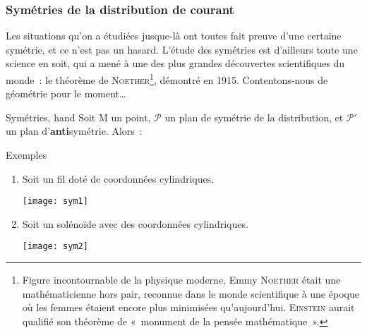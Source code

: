 \documentclass[../main/main.tex]{subfiles}
\begin{document}
\subsubsection{Symétries de la distribution de courant}
\label{sssec:symdist}
Les situations qu'on a étudiées jusque-là ont toutes fait preuve d'une certaine
symétrie, et ce n'est pas un hasard. L'étude des symétries est d'ailleurs toute
une science en soit, qui a mené à une des plus grandes découvertes scientifiques
du monde~: le théorème de \textsc{Noether}\footnote{Figure incontournable de la
  physique moderne, Emmy \textsc{Noether} était une mathématicienne hors pair,
reconnue dans le monde scientifique à une époque où les femmes étaient encore
plus minimisées qu'aujourd'hui. \textsc{Einstein} aurait qualifié son théorème
de «~monument de la pensée mathématique~».}, démontré en 1915. Contentons-nous
de géométrie pour le moment…
\begin{tror}{Symétries, hand}
  Soit M un point, $\mathcal{P}$ un plan de symétrie de la distribution, et
  $\mathcal{P'}$ un plan d'\textbf{anti}symétrie. Alors~:
\end{tror}
\begin{texem}{Exemples}
  \begin{enumerate}
    \item Soit un fil doté de coordonnées cylindriques.
      \begin{center}
        \texttt{[image: sym1]}
      \end{center}
      \item Soit un solénoïde avec des coordonnées cylindriques.
        \begin{center}
          \texttt{[image: sym2]}
        \end{center}
  \end{enumerate}
\end{texem}
\end{document}
